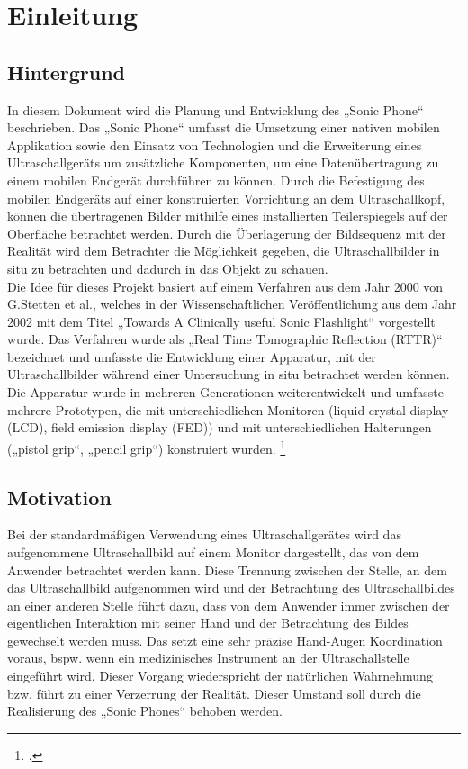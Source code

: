 \chapter{Einleitung}
\section{Hintergrund}
In diesem Dokument wird die Planung und Entwicklung des „Sonic Phone“ beschrieben. Das „Sonic Phone“ umfasst die Umsetzung einer nativen mobilen Applikation sowie den Einsatz von Technologien und die Erweiterung eines Ultraschallgeräts um zusätzliche Komponenten, um eine Datenübertragung zu einem mobilen Endgerät durchführen zu können. Durch die Befestigung des mobilen Endgeräts auf einer konstruierten Vorrichtung an dem Ultraschallkopf, können die übertragenen Bilder mithilfe eines installierten Teilerspiegels auf der Oberfläche betrachtet werden.  Durch die Überlagerung der Bildsequenz mit der Realität wird dem Betrachter die Möglichkeit gegeben, die Ultraschallbilder in situ zu betrachten und dadurch in das Objekt zu schauen.\\
Die Idee für dieses Projekt basiert auf einem Verfahren aus dem Jahr 2000 von G.Stetten et al., welches in der Wissenschaftlichen Veröffentlichung aus dem Jahr 2002 mit dem Titel „Towards A Clinically useful Sonic Flashlight“ vorgestellt wurde. Das Verfahren wurde als „Real Time Tomographic Reflection (RTTR)“ bezeichnet und umfasste die Entwicklung einer Apparatur, mit der Ultraschallbilder während einer Untersuchung in situ  betrachtet werden können. Die Apparatur wurde in mehreren Generationen weiterentwickelt und umfasste mehrere Prototypen, die mit unterschiedlichen Monitoren (liquid crystal display (LCD), field emission display (FED)) und mit unterschiedlichen Halterungen („pistol grip“, „pencil grip“) konstruiert wurden. \footcite{SonicFlashlight} 

\section{Motivation}
Bei der standardmäßigen Verwendung eines Ultraschallgerätes wird das aufgenommene Ultraschallbild auf einem Monitor dargestellt, das von dem Anwender betrachtet werden kann. Diese Trennung zwischen der Stelle, an dem das Ultraschallbild aufgenommen wird und der Betrachtung des Ultraschallbildes an einer anderen Stelle führt dazu, dass von dem Anwender immer zwischen der eigentlichen Interaktion mit seiner Hand und der Betrachtung des Bildes gewechselt werden muss. Das setzt eine sehr präzise Hand-Augen Koordination voraus, bspw. wenn ein medizinisches Instrument an der Ultraschallstelle eingeführt wird. Dieser Vorgang wiederspricht der natürlichen Wahrnehmung bzw. führt zu einer Verzerrung der Realität. Dieser Umstand soll durch die Realisierung des „Sonic Phones“ behoben werden.
